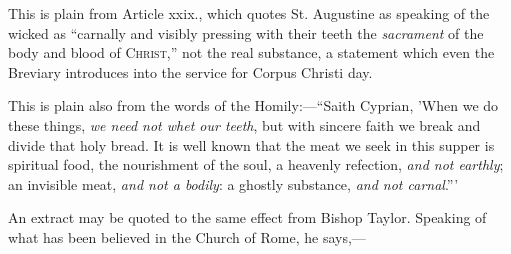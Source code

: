 This is plain from Article xxix., which quotes St. Augustine as
speaking of the wicked as ``carnally and visibly pressing with
their teeth the \emph{sacrament} of the body and blood of C\textsc{hrist},''
not the real substance, a statement which even the Breviary introduces
into the service for Corpus Christi day.

This is plain also from the words of the Homily:—``Saith
Cyprian, 'When we do these things, \emph{we need not whet our teeth},
but with sincere faith we break and divide that holy bread. It is well
known that the meat we seek in this supper is spiritual food, the
nourishment of the soul, a heavenly refection, \emph{and not earthly};
an invisible meat, \emph{and not a bodily}: a ghostly substance, \emph{and
not carnal}.'''

An extract may be quoted to the same effect from Bishop Taylor.
Speaking of what has been believed in the Church of Rome, he says,—

